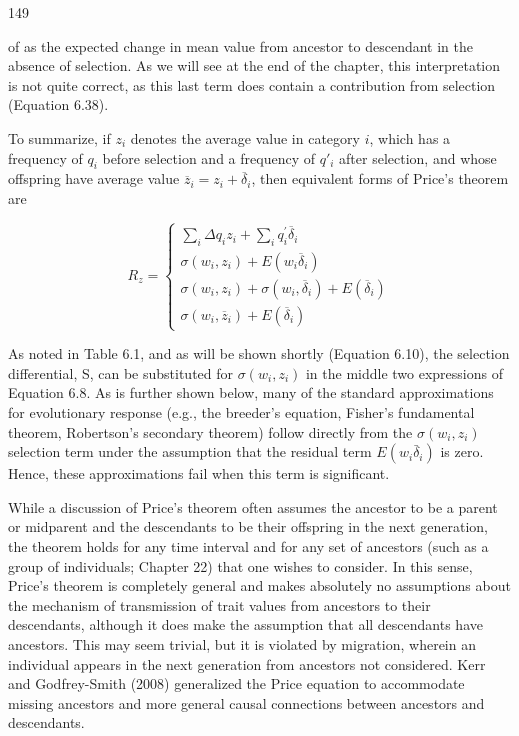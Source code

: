 \documentclass{article}
\begin{document}
149

of as the expected change in mean value from ancestor to descendant in the absence of selection. As we will see at the end of the chapter, this interpretation is not quite correct, as this last term does contain a contribution from selection (Equation 6.38).

To summarize, if  $ z_i $ denotes the average value in category  $ i $, which has a frequency of  $ q_i $ before selection and a frequency of  $ q'_i $ after selection, and whose offspring have average value  $ \overline{z}_i = z_i + \overline{\delta}_i $, then equivalent forms of Price's theorem are

\begin{equation}
R_{z}=\left\{\begin{array}{l}\sum_{i}\Delta q_{i}z_{i}+\sum_{i}q_{i}^{\prime}\overline{\delta}_{i}\\\sigma(w_{i},z_{i})+E(w_{i}\overline{\delta}_{i})\\\sigma(w_{i},z_{i})+\sigma(w_{i},\overline{\delta}_{i})+E(\overline{\delta}_{i})\\\sigma(w_{i},\overline{z}_{i})+E(\overline{\delta}_{i})\end{array}\right.
\tag{6.8}
\label{eq:6_8}
\end{equation}

As noted in Table 6.1, and as will be shown shortly (Equation 6.10), the selection differential, S, can be substituted for  $ \sigma(w_i, z_i) $ in the middle two expressions of Equation 6.8. As is further shown below, many of the standard approximations for evolutionary response (e.g., the breeder's equation, Fisher's fundamental theorem, Robertson's secondary theorem) follow directly from the  $ \sigma(w_i, z_i) $ selection term under the assumption that the residual term  $ E(w_i \bar{\delta}_i) $ is zero. Hence, these approximations fail when this term is significant.

While a discussion of Price’s theorem often assumes the ancestor to be a parent or midparent and the descendants to be their offspring in the next generation, the theorem holds for any time interval and for any set of ancestors (such as a group of individuals; Chapter 22) that one wishes to consider. In this sense, Price’s theorem is completely general and makes absolutely no assumptions about the mechanism of transmission of trait values from ancestors to their descendants, although it does make the assumption that all descendants have ancestors. This may seem trivial, but it is violated by migration, wherein an individual appears in the next generation from ancestors not considered. Kerr and Godfrey-Smith (2008) generalized the Price equation to accommodate missing ancestors and more general causal connections between ancestors and descendants.
\end{document}
